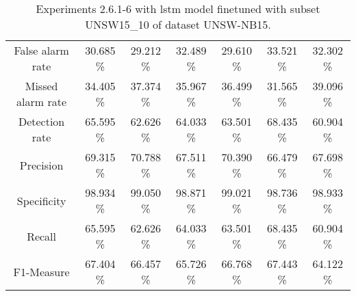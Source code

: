 \begin{table}[htb]
\begin{tabular}{@{}ccccccc@{}}
        False alarm rate &  30.685 \% &  29.212 \% &  32.489 \% &  29.610 \% &  33.521 \% &  32.302 \% \\
        Missed alarm rate &  34.405 \% &  37.374 \% &  35.967 \% &  36.499 \% &  31.565 \% &  39.096 \% \\
        Detection rate &  65.595 \% &  62.626 \% &  64.033 \% &  63.501 \% &  68.435 \% &  60.904 \% \\
        Precision &  69.315 \% &  70.788 \% &  67.511 \% &  70.390 \% &  66.479 \% &  67.698 \% \\
        Specificity &  98.934 \% &  99.050 \% &  98.871 \% &  99.021 \% &  98.736 \% &  98.933 \% \\
        Recall &  65.595 \% &  62.626 \% &  64.033 \% &  63.501 \% &  68.435 \% &  60.904 \% \\
        F1-Measure &  67.404 \% &  66.457 \% &  65.726 \% &  66.768 \% &  67.443 \% &  64.122 \% \\
        \bottomrule
    \end{tabular}
    \caption{Experiments 2.6.1-6 with \gls{lstm} model finetuned with subset UNSW15\_10 of dataset UNSW-NB15.}
    \label{table:results:lstm:stats_flows15_subset}
\end{table}